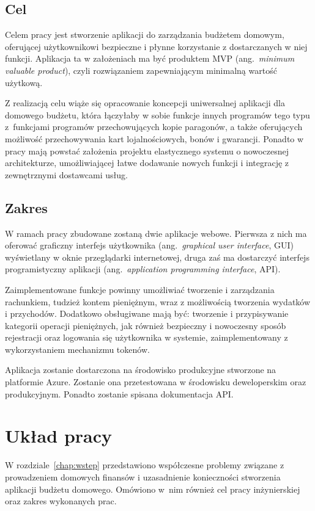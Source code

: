 \subsection{Cel}
\label{subsec:cel}
Celem pracy jest stworzenie aplikacji do zarządzania budżetem domowym, oferującej użytkownikowi bezpieczne i płynne korzystanie z dostarczanych w niej funkcji.
Aplikacja ta w założeniach ma być produktem MVP (ang.~\emph{minimum valuable product}), czyli rozwiązaniem zapewniającym minimalną wartość użytkową.  

Z realizacją celu wiąże się opracowanie koncepcji uniwersalnej aplikacji dla domowego budżetu, która łączyłaby w sobie funkcje innych programów tego typu z~funkcjami programów przechowujących kopie paragonów, a także oferujących możliwość przechowywania kart lojalnościowych, bonów i gwarancji. 
Ponadto w pracy mają powstać założenia projektu elastycznego systemu o nowoczesnej architekturze, umożliwiającej łatwe dodawanie nowych funkcji i integrację z zewnętrznymi dostawcami usług. 

\subsection{Zakres}
\label{subsec:zakres}
W ramach pracy zbudowane zostaną dwie aplikacje webowe. Pierwsza z nich ma oferować graficzny interfejs użytkownika (ang.~\emph{graphical user interface}, GUI) wyświetlany w oknie przeglądarki internetowej, druga zaś ma dostarczyć interfejs programistyczny aplikacji (ang.~\emph{application programming interface}, API).

Zaimplementowane funkcje powinny umożliwiać tworzenie i zarządzania  rachunkiem, tudzież kontem pieniężnym, wraz z możliwością tworzenia wydatków i przychodów. Dodatkowo obsługiwane mają być: tworzenie i przypisywanie kategorii operacji pieniężnych, jak również bezpieczny i nowoczesny sposób rejestracji oraz logowania się użytkownika w systemie, zaimplementowany z wykorzystaniem mechanizmu tokenów.

Aplikacja zostanie dostarczona na środowisko produkcyjne stworzone na platformie Azure. Zostanie ona przetestowana w środowisku deweloperskim oraz produkcyjnym. Ponadto zostanie spisana dokumentacja API.

\section{Układ pracy}
\label{sec:uklad-pracy}
W rozdziale~\ref{chap:wstep} przedstawiono współczesne problemy związane z prowadzeniem domowych finansów i uzasadnienie konieczności stworzenia aplikacji budżetu domowego. Omówiono w~nim również cel pracy inżynierskiej oraz zakres wykonanych prac.

